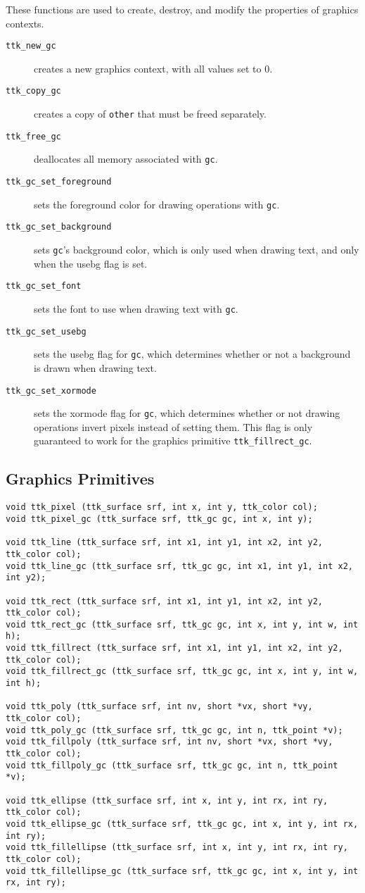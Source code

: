 \documentclass[12pt,letterpaper]{report}
\let\ttt\tt
\def\tt{\def\_{{\ttt\char`\_}}\ttt}
\begin{document}
These functions are used to create, destroy, and modify the properties of graphics contexts.

\begin{description}
\item[{\tt ttk_new_gc}] creates a new graphics context, with all values set to 0.
\item[{\tt ttk_copy_gc}] creates a copy of \verb|other| that must be freed separately.
\item[{\tt ttk_free_gc}] deallocates all memory associated with \verb|gc|.
\item[{\tt ttk_gc_set_foreground}] sets the foreground color for drawing operations with \verb|gc|.
\item[{\tt ttk_gc_set_background}] sets \verb|gc|'s background color, which is only used when drawing text,
  and only when the {\sf usebg} flag is set.
\item[{\tt ttk_gc_set_font}] sets the font to use when drawing text with \verb|gc|.
\item[{\tt ttk_gc_set_usebg}] sets the {\sf usebg} flag for \verb|gc|, which determines whether or not
a background is drawn when drawing text.
\item[{\tt ttk_gc_set_xormode}] sets the {\sf xormode} flag for \verb|gc|, which determines whether or not
drawing operations invert pixels instead of setting them. This flag is only guaranteed to work for the graphics
primitive \verb|ttk_fillrect_gc|.
\end{description}

\subsection{Graphics Primitives}
{\footnotesize
\begin{verbatim}
void ttk_pixel (ttk_surface srf, int x, int y, ttk_color col);
void ttk_pixel_gc (ttk_surface srf, ttk_gc gc, int x, int y);

void ttk_line (ttk_surface srf, int x1, int y1, int x2, int y2, ttk_color col);
void ttk_line_gc (ttk_surface srf, ttk_gc gc, int x1, int y1, int x2, int y2);

void ttk_rect (ttk_surface srf, int x1, int y1, int x2, int y2, ttk_color col);
void ttk_rect_gc (ttk_surface srf, ttk_gc gc, int x, int y, int w, int h);
void ttk_fillrect (ttk_surface srf, int x1, int y1, int x2, int y2, ttk_color col);
void ttk_fillrect_gc (ttk_surface srf, ttk_gc gc, int x, int y, int w, int h);

void ttk_poly (ttk_surface srf, int nv, short *vx, short *vy, ttk_color col);
void ttk_poly_gc (ttk_surface srf, ttk_gc gc, int n, ttk_point *v);
void ttk_fillpoly (ttk_surface srf, int nv, short *vx, short *vy, ttk_color col);
void ttk_fillpoly_gc (ttk_surface srf, ttk_gc gc, int n, ttk_point *v);

void ttk_ellipse (ttk_surface srf, int x, int y, int rx, int ry, ttk_color col);
void ttk_ellipse_gc (ttk_surface srf, ttk_gc gc, int x, int y, int rx, int ry);
void ttk_fillellipse (ttk_surface srf, int x, int y, int rx, int ry, ttk_color col);
void ttk_fillellipse_gc (ttk_surface srf, ttk_gc gc, int x, int y, int rx, int ry);
\end{verbatim}
}
\end{document}
